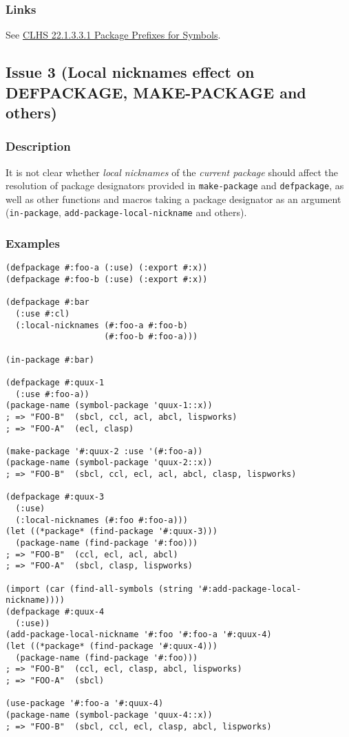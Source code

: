 \documentclass[11pt]{article}
\begin{document}
\subsubsection{Links}
\label{sec:org9c7c78a}
See \href{https://www.lispworks.com/documentation/HyperSpec/Body/22\_acca.htm}{CLHS 22.1.3.3.1 Package Prefixes for Symbols}.

\subsection{Issue 3 (Local nicknames effect on DEFPACKAGE, MAKE-PACKAGE and others)}
\label{sec:orgc089786}
\subsubsection{Description}
\label{sec:orga4938bc}
It is not clear whether \emph{local nicknames} of the \emph{current package} should affect
the resolution of package designators provided in \texttt{make-package} and \texttt{defpackage},
as well as other functions and macros taking a package designator as an argument
(\texttt{in-package}, \texttt{add-package-local-nickname} and others).
\subsubsection{Examples}
\label{sec:org188886c}
\begin{verbatim}
(defpackage #:foo-a (:use) (:export #:x))
(defpackage #:foo-b (:use) (:export #:x))

(defpackage #:bar
  (:use #:cl)
  (:local-nicknames (#:foo-a #:foo-b)
                    (#:foo-b #:foo-a)))

(in-package #:bar)

(defpackage #:quux-1
  (:use #:foo-a))
(package-name (symbol-package 'quux-1::x))
; => "FOO-B"  (sbcl, ccl, acl, abcl, lispworks)
; => "FOO-A"  (ecl, clasp)

(make-package '#:quux-2 :use '(#:foo-a))
(package-name (symbol-package 'quux-2::x))
; => "FOO-B"  (sbcl, ccl, ecl, acl, abcl, clasp, lispworks)

(defpackage #:quux-3
  (:use)
  (:local-nicknames (#:foo #:foo-a)))
(let ((*package* (find-package '#:quux-3)))
  (package-name (find-package '#:foo)))
; => "FOO-B"  (ccl, ecl, acl, abcl)
; => "FOO-A"  (sbcl, clasp, lispworks)

(import (car (find-all-symbols (string '#:add-package-local-nickname))))
(defpackage #:quux-4
  (:use))
(add-package-local-nickname '#:foo '#:foo-a '#:quux-4)
(let ((*package* (find-package '#:quux-4)))
  (package-name (find-package '#:foo)))
; => "FOO-B"  (ccl, ecl, clasp, abcl, lispworks)
; => "FOO-A"  (sbcl)

(use-package '#:foo-a '#:quux-4)
(package-name (symbol-package 'quux-4::x))
; => "FOO-B"  (sbcl, ccl, ecl, clasp, abcl, lispworks)
\end{verbatim}
\end{document}
